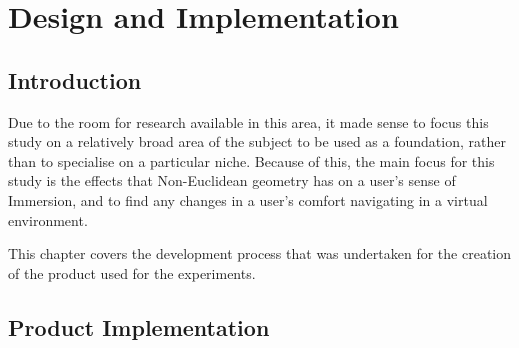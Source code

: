 \chapter[Product]{Design and Implementation}
\label{design}

	\section{Introduction}
	\label{design:intro}

		Due to the room for research available in this area, it made sense to focus this study on a relatively broad area of the subject to be used as a foundation, rather than to specialise on a particular niche.
		Because of this, the main focus for this study is the effects that Non-Euclidean geometry has on a user's sense of Immersion, and to find any changes in a user's comfort navigating in a virtual environment.

		This chapter covers the development process that was undertaken for the creation of the product used for the experiments.






	\section[Implementation]{Product Implementation}
	\label{design:model}

